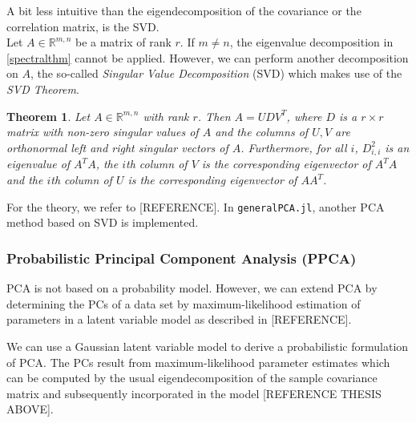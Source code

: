 \documentclass[journal, a4paper]{IEEEtran}
\newtheorem{theorem}{Theorem}[section]
\begin{document}
A bit less intuitive than the eigendecomposition of the covariance or the correlation matrix, is the SVD.\\
Let \( A \in \mathbb{R}^{m,n} \) be a matrix of rank \( r \). If \( m \neq n\), the eigenvalue decomposition in \ref{spectralthm} cannot be applied. However, we can perform another decomposition on \( A \), the so-called \textit{Singular Value Decomposition} (SVD) which makes use of the \textit{SVD Theorem}.
\begin{theorem}\label{svdthm}
	Let \( A \in \mathbb{R}^{m,n} \) with rank \( r \). Then \( A = UDV^T\), where \( D \) is a \( r \times r \) matrix with non-zero singular values of \( A \) and the columns of \( U, V \) are orthonormal left and right singular vectors of \( A \). Furthermore, for all \( i \), \( D_{i,i}^{2} \) is an eigenvalue of \( A^T A\), the \( i \)th column of \( V \) is the corresponding eigenvector of \( A^T A\) and the \( i \)th column of \( U \) is the corresponding eigenvector of \( A A^T\).
\end{theorem}

For the theory, we refer to [REFERENCE]. 
In \texttt{generalPCA.jl}, another PCA method based on SVD is implemented.



\hfill
\subsubsection{Probabilistic Principal Component Analysis (PPCA)}

PCA is not based on a probability model. However, we can extend PCA by determining the PCs of a data set by maximum-likelihood estimation of parameters in a latent variable model as described in [REFERENCE].

We can use a Gaussian latent variable model %
to derive a probabilistic formulation of PCA. The PCs result from maximum-likelihood parameter estimates which can be computed by the usual eigendecomposition of the sample covariance matrix and subsequently incorporated in the model [REFERENCE THESIS ABOVE]. 
\end{document}
